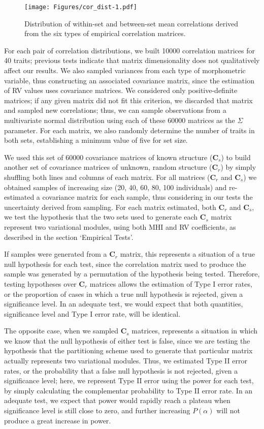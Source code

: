 \documentclass[12pt,twoside]{report}
\begin{document}
\begin{figure}[htbp]
\centering
\texttt{[image: Figures/cor\_dist-1.pdf]}
\caption{Distribution of within-set and between-set mean correlations
derived from the six types of empirical correlation matrices.
\label{fig:cor_dist}}
\end{figure}

For each pair of correlation distributions, we built 10000 correlation
matrices for 40 traits; previous tests indicate that matrix
dimensionality does not qualitatively affect our results. We also
sampled variances from each type of morphometric variable, thus
constructing an associated covariance matrix, since the estimation of RV
values uses covariance matrices. We considered only positive-definite
matrices; if any given matrix did not fit this criterion, we discarded
that matrix and sampled new correlations; thus, we can sample
observations from a multivariate normal distribution using each of these
60000 matrices as the $\Sigma$ parameter. For each matrix, we also
randomly determine the number of traits in both sets, establishing a
minimum value of five for set size.

We used this set of 60000 covariance matrices of known structure
($\mathbf{C}_s$) to build another set of covariance matrices of unknown,
random structure ($\mathbf{C}_r$) by simply shuffling both lines and
columns of each matrix. For all matrices ($\mathbf{C}_r$ and
$\mathbf{C}_s$) we obtained samples of increasing size (20, 40, 60, 80,
100 individuals) and re-estimated a covariance matrix for each sample,
thus considering in our tests the uncertainty derived from sampling. For
each matrix estimated, both $\mathbf{C}_r$ and $\mathbf{C}_s$, we test
the hypothesis that the two sets used to generate each $\mathbf{C}_s$
matrix represent two variational modules, using both MHI and RV
coefficients, as described in the section `Empirical Tests'.

If samples were generated from a $\mathbf{C}_r$ matrix, this represents
a situation of a true null hypothesis for each test, since the
correlation matrix used to produce the sample was generated by a
permutation of the hypothesis being tested. Therefore, testing
hypotheses over $\mathbf{C}_r$ matrices allows the estimation of Type I
error rates, or the proportion of cases in which a true null hypothesis
is rejected, given a significance level. In an adequate test, we would
expect that both quantities, significance level and Type I error rate,
will be identical.

The opposite case, when we sampled $\mathbf{C}_s$ matrices, represents a
situation in which we know that the null hypothesis of either test is
false, since we are testing the hypothesis that the partitioning scheme
used to generate that particular matrix actually represents two
variational modules. Thus, we estimated Type II error rates, or the
probability that a false null hypothesis is not rejected, given a
significance level; here, we represent Type II error using the power for
each test, by simply calculating the complementar probability to Type II
error rate. In an adequate test, we expect that power would rapidly
reach a plateau when significance level is still close to zero, and
further increasing $P(\alpha)$ will not produce a great increase in
power.
\end{document}
